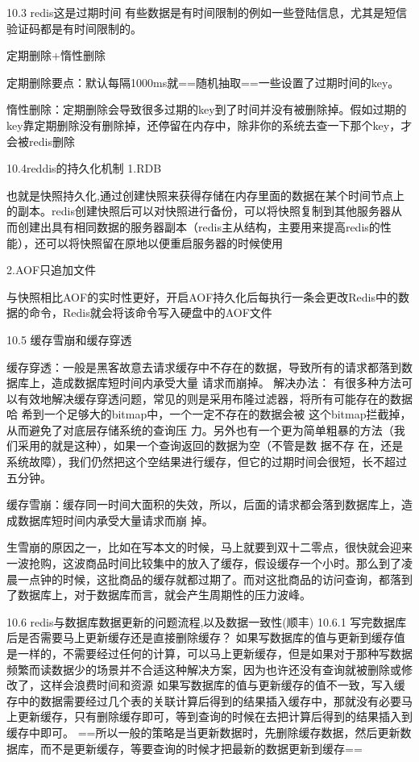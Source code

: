 \documentclass[UTF8]{ctexart}
\begin{document}
10.3 redis这是过期时间
有些数据是有时间限制的例如一些登陆信息，尤其是短信验证码都是有时间限制的。

定期删除+惰性删除

定期删除要点：默认每隔1000ms就==随机抽取==一些设置了过期时间的key。

惰性删除：定期删除会导致很多过期的key到了时间并没有被删除掉。假如过期的key靠定期删除没有删除掉，还停留在内存中，除非你的系统去查一下那个key，才会被redis删除

10.4reddis的持久化机制
1.RDB

也就是快照持久化,通过创建快照来获得存储在内存里面的数据在某个时间节点上的副本。redis创建快照后可以对快照进行备份，可以将快照复制到其他服务器从而创建出具有相同数据的服务器副本（redis主从结构，主要用来提高redis的性能），还可以将快照留在原地以便重启服务器的时候使用

2.AOF只追加文件

与快照相比AOF的实时性更好，开启AOF持久化后每执行一条会更改Redis中的数据的命令，Redis就会将该命令写入硬盘中的AOF文件

10.5 缓存雪崩和缓存穿透

缓存穿透：一般是黑客故意去请求缓存中不存在的数据，导致所有的请求都落到数据库上，造成数据库短时间内承受大量 请求而崩掉。
解决办法： 有很多种方法可以有效地解决缓存穿透问题，常见的则是采用布隆过滤器，将所有可能存在的数据哈 希到一个足够大的bitmap中，一个一定不存在的数据会被 这个bitmap拦截掉，从而避免了对底层存储系统的查询压 力。另外也有一个更为简单粗暴的方法（我们采用的就是这种），如果一个查询返回的数据为空（不管是数 据不存 在，还是系统故障），我们仍然把这个空结果进行缓存，但它的过期时间会很短，长不超过五分钟。

缓存雪崩：缓存同一时间大面积的失效，所以，后面的请求都会落到数据库上，造成数据库短时间内承受大量请求而崩 掉。

生雪崩的原因之一，比如在写本文的时候，马上就要到双十二零点，很快就会迎来一波抢购，这波商品时间比较集中的放入了缓存，假设缓存一个小时。那么到了凌晨一点钟的时候，这批商品的缓存就都过期了。而对这批商品的访问查询，都落到了数据库上，对于数据库而言，就会产生周期性的压力波峰。

10.6 redis与数据库数据更新的问题流程,以及数据一致性(顺丰)
10.6.1 写完数据库后是否需要马上更新缓存还是直接删除缓存？
如果写数据库的值与更新到缓存值是一样的，不需要经过任何的计算，可以马上更新缓存，但是如果对于那种写数据频繁而读数据少的场景并不合适这种解决方案，因为也许还没有查询就被删除或修改了，这样会浪费时间和资源
如果写数据库的值与更新缓存的值不一致，写入缓存中的数据需要经过几个表的关联计算后得到的结果插入缓存中，那就没有必要马上更新缓存，只有删除缓存即可，等到查询的时候在去把计算后得到的结果插入到缓存中即可。
==所以一般的策略是当更新数据时，先删除缓存数据，然后更新数据库，而不是更新缓存，等要查询的时候才把最新的数据更新到缓存==
\end{document}

